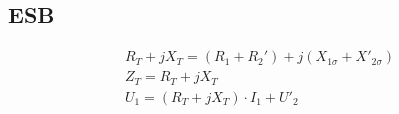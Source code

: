 \subsection{ESB}
\vspace{-2em}
\begin{gather*}
    R_{T} + jX_{T} = (R_1+R_2')+j(X_{1\sigma}+X'_{2\sigma})\\
    Z_{T} = R_{T} + jX_{T}\\
    U_1 = (R_T + jX_T) \cdot I_1 + U'_2
\end{gather*}
